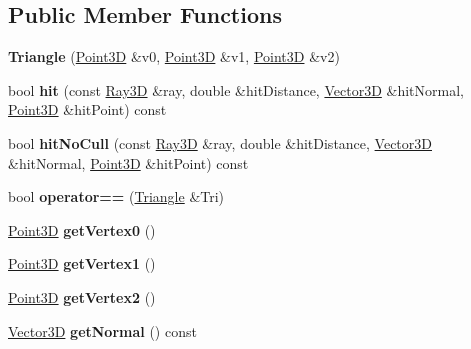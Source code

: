 \subsection*{Public Member Functions}
\begin{DoxyCompactItemize}
\item 
\hypertarget{class_triangle_a995e961620da6b595053ef5560999244}{}\label{class_triangle_a995e961620da6b595053ef5560999244} 
{\bfseries Triangle} (\hyperlink{class_point3_d}{Point3D} \&v0, \hyperlink{class_point3_d}{Point3D} \&v1, \hyperlink{class_point3_d}{Point3D} \&v2)
\item 
\hypertarget{class_triangle_ab09716ce6c0928ce11fe34091c19a1c4}{}\label{class_triangle_ab09716ce6c0928ce11fe34091c19a1c4} 
bool {\bfseries hit} (const \hyperlink{class_ray3_d}{Ray3D} \&ray, double \&hit\+Distance, \hyperlink{class_vector3_d}{Vector3D} \&hit\+Normal, \hyperlink{class_point3_d}{Point3D} \&hit\+Point) const
\item 
\hypertarget{class_triangle_a7b93ca1524b80830bf8ea07d660ace6a}{}\label{class_triangle_a7b93ca1524b80830bf8ea07d660ace6a} 
bool {\bfseries hit\+No\+Cull} (const \hyperlink{class_ray3_d}{Ray3D} \&ray, double \&hit\+Distance, \hyperlink{class_vector3_d}{Vector3D} \&hit\+Normal, \hyperlink{class_point3_d}{Point3D} \&hit\+Point) const
\item 
\hypertarget{class_triangle_aeeced29a75e5c27db3457804debbb936}{}\label{class_triangle_aeeced29a75e5c27db3457804debbb936} 
bool {\bfseries operator==} (\hyperlink{class_triangle}{Triangle} \&Tri)
\item 
\hypertarget{class_triangle_a7dbe3b94aae0c1966801d50190ab2c25}{}\label{class_triangle_a7dbe3b94aae0c1966801d50190ab2c25} 
\hyperlink{class_point3_d}{Point3D} {\bfseries get\+Vertex0} ()
\item 
\hypertarget{class_triangle_a88c0bdcbda9d290e7ea876714b634b83}{}\label{class_triangle_a88c0bdcbda9d290e7ea876714b634b83} 
\hyperlink{class_point3_d}{Point3D} {\bfseries get\+Vertex1} ()
\item 
\hypertarget{class_triangle_aa29a363ca196b8352c749174cfd0ebd9}{}\label{class_triangle_aa29a363ca196b8352c749174cfd0ebd9} 
\hyperlink{class_point3_d}{Point3D} {\bfseries get\+Vertex2} ()
\item 
\hypertarget{class_triangle_a30e9a577df2eb923fd8c869fc1958cd1}{}\label{class_triangle_a30e9a577df2eb923fd8c869fc1958cd1} 
\hyperlink{class_vector3_d}{Vector3D} {\bfseries get\+Normal} () const
\item 
\hypertarget{class_triangle_a557fd01902542dca2bccb3de38aa1534}{}\label{class_triangle_a557fd01902542dca2bccb3de38aa1534} 

\end{DoxyCompactItemize}

